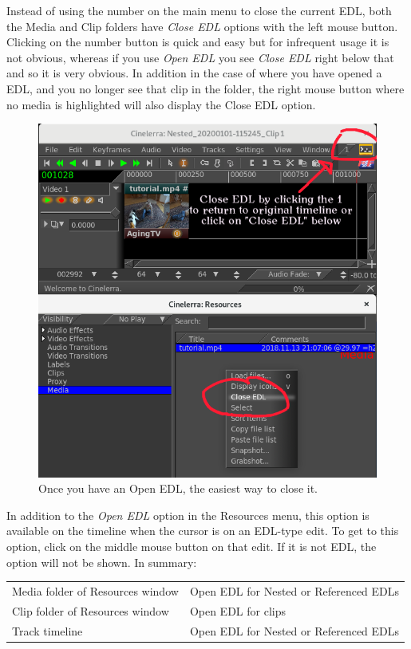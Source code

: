 Instead of using the number on the main menu to close the current
EDL, both the Media and Clip folders have \textit{Close EDL} options
with the left mouse button. Clicking on the number button is quick and
easy but for infrequent usage it is not obvious, whereas if you use
\textit{Open EDL} you see \textit{Close EDL} right below that and so
it is very obvious.  In addition in the case of where you have
opened a EDL, and you no longer see that clip in the folder, the
right mouse button where no media is highlighted will also display
the Close EDL option.

\begin{figure}[h]
	\centering
	\includegraphics[width=1\linewidth]{editing-img001.png}
	\caption{Once you have an Open EDL, the easiest way to close it.}
	\label{fig:open_edl}
\end{figure}
\relax

In addition to the \textit{Open EDL} option in the Resources menu,
this option is available on the timeline when the cursor is on an
EDL-type edit. To get to this option, click on the middle mouse
button on that edit.  If it is not EDL, the option will not be
shown.  In summary:

\begin{center}
	\begin{tabular}{ll}
		\toprule
		Media folder of Resources window & Open EDL for Nested or Referenced EDLs\\
		Clip folder of Resources window & Open EDL for clips\\
		Track timeline & Open EDL for Nested or Referenced EDLs\\
		\bottomrule
	\end{tabular}
\end{center}

